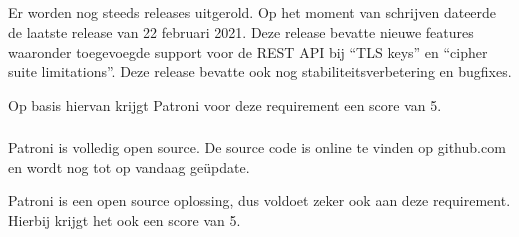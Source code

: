 \subsection{}
\label{subsec:Should have}



\subsubsection{}
\label{subsubsec:Actieve ondersteuning in 2020-2021}

Er worden nog steeds releases uitgerold. Op het moment van schrijven dateerde de laatste release van 22 februari 2021. Deze release bevatte nieuwe features waaronder toegevoegde support voor de REST API bij “TLS keys” en “cipher suite limitations”. Deze release bevatte ook nog stabiliteitsverbetering en bugfixes.

Op basis hiervan krijgt Patroni voor deze requirement een score van 5.

\subsubsection{}
\label{subsubsec:Open source}

Patroni is volledig open source. De source code is online te vinden op github.com en wordt nog tot op vandaag geüpdate.

Patroni is een open source oplossing, dus voldoet zeker ook aan deze requirement. Hierbij krijgt het ook een score van 5.

\subsection{}
\label{subsec:Could have}

